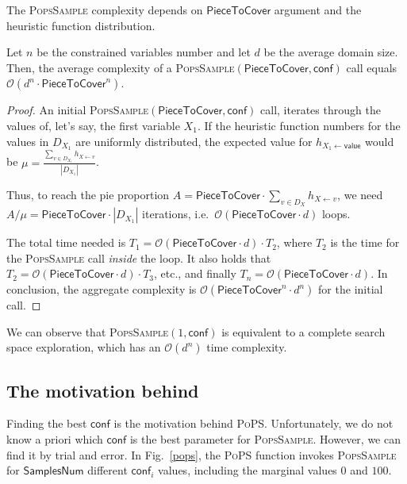 \documentclass{ws-ijait}
\begin{document}
The \textsc{PopsSample} complexity depends on
$\mathsf{PieceToCover}$ argument and the heuristic function
distribution.
\begin{lemma}
  Let $n$ be the constrained variables number and let $d$ be
  the average domain size. Then, the average complexity of a
  \textsc{PopsSample}$(\mathsf{PieceToCover},\mathsf{conf})$
  call equals $\mathcal{O}(d^n \cdot
  \mathsf{PieceToCover}^n)$.
\end{lemma}
\begin{proof}
  An initial
  \textsc{PopsSample}$(\mathsf{PieceToCover},\mathsf{conf})$
  call, iterates through the values of, let's say, the first
  variable $X_1$. If the heuristic function numbers for the
  values in $D_{X_1}$ are uniformly distributed, the
  expected value for $h_{X_1 \gets \mathsf{value}}$ would be
  $\mu = \frac{\sum_{v \in D_{X_1}} h_{X \gets
  v}}{|D_{X_1}|}$.

  Thus, to reach the pie proportion $A =
  \mathsf{PieceToCover} \cdot \sum_{v \in D_X} h_{X \gets
  v}$, we need $A / \mu = \mathsf{PieceToCover} \cdot
  |D_{X_1}|$ iterations, i.e.\ 
  $\mathcal{O}(\mathsf{PieceToCover} \cdot d)$ loops.

  The total time needed is $T_1 =
  \mathcal{O}(\mathsf{PieceToCover} \cdot d) \cdot T_2$,
  where $T_2$ is the time for the \textsc{PopsSample} call
  \emph{inside} the loop. It also holds that $T_2 =
  \mathcal{O}(\mathsf{PieceToCover} \cdot d) \cdot T_3$,
  etc., and finally $T_n = \mathcal{O}(\mathsf{PieceToCover}
  \cdot d)$. In conclusion, the aggregate complexity is
  $\mathcal{O}(\mathsf{PieceToCover}^n \cdot d^n)$ for the
  initial call.
\end{proof}
We can observe that \textsc{PopsSample}$(1,\mathsf{conf})$
is equivalent to a complete search space exploration, which
has an $\mathcal{O}(d^n)$ time complexity.

\subsection{The motivation behind \PoPS\label{sampling}}

Finding the best $\mathsf{conf}$ is the motivation behind
\textsc{PoPS}. Unfortunately, we do not know a priori which
$\mathsf{conf}$ is the best parameter for
\textsc{PopsSample}. However, we can find it by trial and
error. In Fig.~\ref{pops}, the \textsc{PoPS} function
invokes \textsc{PopsSample} for $\mathsf{SamplesNum}$
different $\mathsf{conf}_i$ values, including the marginal
values $0$ and $100$.
\end{document}
